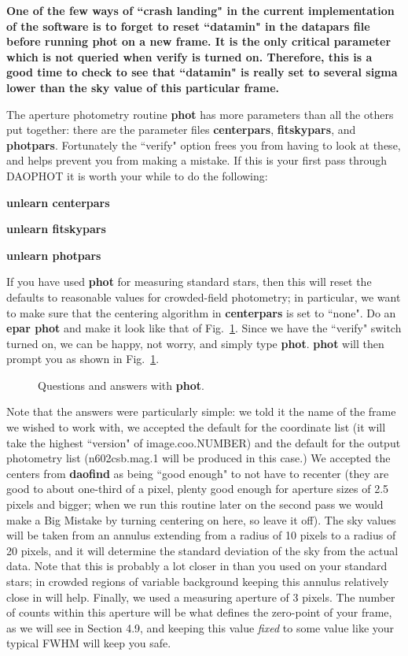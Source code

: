 {\bf One of the few ways of ``crash landing" in the current
implementation of the software is to forget to reset ``datamin" in the
datapars file before running phot on a new frame.  It is the only
critical parameter which is not queried when verify is turned on.  Therefore,
this is a good time to check to see that ``datamin" is really set to
several sigma lower than the sky value of this particular frame.}
 
The aperture photometry routine {\bf phot} has more parameters than all
the others put together: there are the parameter files 
{\bf centerpars}, {\bf fitskypars}, and {\bf photpars}.  
Fortunately the ``verify"
option frees you from having to look at these, and helps prevent you
from making a mistake. If this is your first pass through DAOPHOT it is
worth your while to do the following:
 
\centerline{ {\bf unlearn centerpars} }
 
\centerline{ {\bf unlearn fitskypars} }
 
\centerline{ {\bf unlearn photpars} }
 
\noindent
If you have used {\bf phot} for measuring standard stars, then this will
reset the defaults to reasonable values for crowded-field photometry; 
in particular, we want to make sure that the centering
algorithm in {\bf centerpars} is set to ``none".  
Do an {\bf epar phot} and make it look like that of Fig.~\ref{phot}.
Since we have the ``verify" switch turned on, we can be happy, not
worry, and simply type {\bf phot}.
{\bf phot} will then prompt you as shown in
Fig.~\ref{phot}.
\begin{figure}
\vspace{7.0in}
\caption{\label{phot} Questions and answers with {\bf phot}.}
\end{figure}
Note that the answers were particularly simple: we told it the name of
the frame we wished to work with, we accepted the default for the coordinate
list (it will take the highest ``version" of image.coo.NUMBER) and the
default for the output photometry list (n602csb.mag.1 will be produced
in this case.)  We accepted the centers from {\bf daofind} as being
``good enough" to not have to recenter (they are good to about one-third
of a pixel, plenty good enough for aperture sizes of 2.5 pixels and
bigger; when we run this routine later on the second pass we would make
a Big Mistake by turning centering on here, so leave it off). 
The sky
values will be taken from an annulus extending from a radius of 10
pixels to a radius of 20 pixels, and it will determine the standard
deviation of the sky from the actual data.  Note that this is probably a
lot closer in than you used on your standard stars; in crowded regions
of variable background keeping this annulus relatively close in will
help.
Finally, we used a measuring
aperture of 3 pixels.  The number of counts within this aperture will be
what defines the zero-point of your frame, as we will see in Section 4.9,
and keeping this value {\it fixed} to some value like your typical FWHM
will keep you safe.
 
